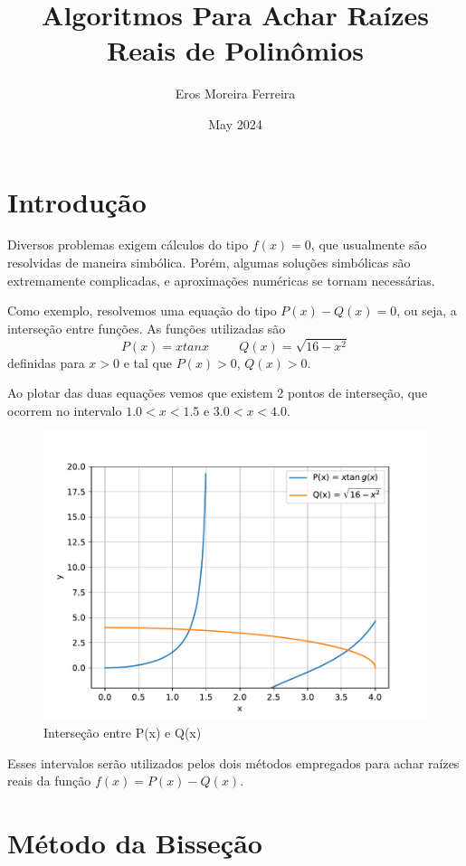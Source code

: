 \documentclass[12pt, a4paper]{report}
\title{Algoritmos Para Achar Raízes Reais de Polinômios}
\author{Eros Moreira Ferreira}
\date{May 2024}
\begin{document}
\maketitle

\section{Introdução}

Diversos problemas exigem cálculos do tipo $f(x) = 0$, que usualmente são resolvidas de maneira simbólica. Porém, algumas soluções simbólicas são extremamente complicadas, e aproximações numéricas se tornam necessárias.

Como exemplo, resolvemos uma equação do tipo $P(x)-Q(x) = 0$, ou seja, a interseção entre funções.
As funções utilizadas são
\begin{displaymath}
    P(x) = xtanx \hspace{1cm}  Q(x) = \sqrt{16-x^2}
\end{displaymath}
definidas para $x>0$ e tal que $P(x)>0$, $Q(x)>0$.

Ao plotar das duas equações vemos que existem 2 pontos de interseção, que ocorrem no intervalo $1.0<x<1.5$ e $3.0<x<4.0$.

\begin{figure}[h]
    \centering
    \includegraphics[width=0.8\linewidth]{bissecao.pdf}
    \caption{Interseção entre P(x) e Q(x)}
    \label{fig:enter-label}
\end{figure}

Esses intervalos serão utilizados pelos dois métodos empregados para achar raízes reais da função $f(x) = P(x)-Q(x)$.

\section{Método da Bisseção}
\end{document}
